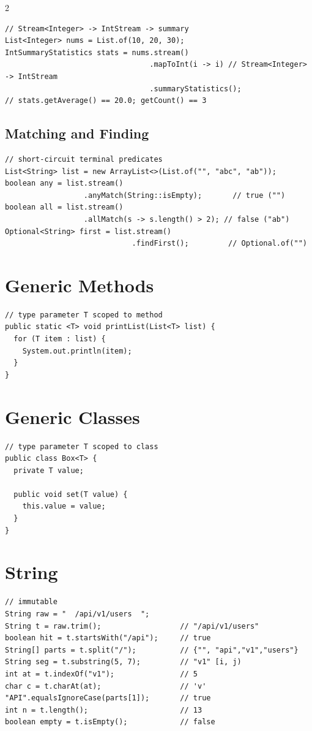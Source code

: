 \documentclass{article}
\begin{document}
\begin{multicols}{2}
\begin{lstlisting}
// Stream<Integer> -> IntStream -> summary
List<Integer> nums = List.of(10, 20, 30);
IntSummaryStatistics stats = nums.stream()
                                 .mapToInt(i -> i) // Stream<Integer> -> IntStream
                                 .summaryStatistics();
// stats.getAverage() == 20.0; getCount() == 3
\end{lstlisting}

\subsection{Matching and Finding}
\begin{lstlisting}
// short-circuit terminal predicates
List<String> list = new ArrayList<>(List.of("", "abc", "ab"));
boolean any = list.stream()
                  .anyMatch(String::isEmpty);       // true ("")
boolean all = list.stream()
                  .allMatch(s -> s.length() > 2); // false ("ab")
Optional<String> first = list.stream()
                             .findFirst();         // Optional.of("")
\end{lstlisting}

\columnbreak


\section{Generic Methods}
\begin{lstlisting}
// type parameter T scoped to method
public static <T> void printList(List<T> list) {
  for (T item : list) {
    System.out.println(item);
  }
}
\end{lstlisting}

\section{Generic Classes}
\begin{lstlisting}
// type parameter T scoped to class
public class Box<T> {
  private T value;

  public void set(T value) {
    this.value = value;
  }
}
\end{lstlisting}


\section{String}
\begin{lstlisting}
// immutable
String raw = "  /api/v1/users  ";
String t = raw.trim();                  // "/api/v1/users"
boolean hit = t.startsWith("/api");     // true
String[] parts = t.split("/");          // {"", "api","v1","users"}
String seg = t.substring(5, 7);         // "v1" [i, j)
int at = t.indexOf("v1");               // 5
char c = t.charAt(at);                  // 'v'
"API".equalsIgnoreCase(parts[1]);       // true
int n = t.length();                     // 13
boolean empty = t.isEmpty();            // false
\end{lstlisting}


\end{multicols}
\end{document}
